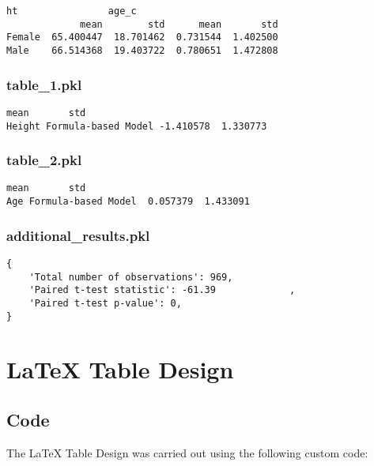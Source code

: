 \documentclass[11pt]{article}
\begin{document}
\begin{Verbatim}[tabsize=4]
               ht                age_c
             mean        std      mean       std
Female  65.400447  18.701462  0.731544  1.402500
Male    66.514368  19.403722  0.780651  1.472808
\end{Verbatim}

\subsubsection*{table\_1.pkl}

\begin{Verbatim}[tabsize=4]
                                mean       std
Height Formula-based Model -1.410578  1.330773
\end{Verbatim}

\subsubsection*{table\_2.pkl}

\begin{Verbatim}[tabsize=4]
                             mean       std
Age Formula-based Model  0.057379  1.433091
\end{Verbatim}

\subsubsection*{additional\_results.pkl}

\begin{Verbatim}[tabsize=4]
{
    'Total number of observations': 969,
    'Paired t-test statistic': -61.39             ,
    'Paired t-test p-value': 0,
}
\end{Verbatim}

\section{LaTeX Table Design}
\subsection{{Code}}
The LaTeX Table Design was carried out using the following custom code:
\end{document}
